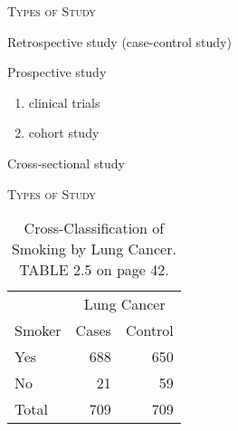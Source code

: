 \documentclass[dvipdfmx, serif,handout]{beamer}
\begin{document}
\begin{frame}{\textsc{Types of Study}}

	\bi
	\item Retrospective study (case-control study)
	\item Prospective study
	\begin{enumerate}
		\item clinical trials
		\item cohort study
	\end{enumerate}
	\item Cross-sectional study
	\ei

\end{frame}
\begin{frame}{\textsc{Types of Study}}

	{\footnotesize
		\begin{table}
			\begin{tabular}{lrr} \hline
				                    & \multicolumn{2}{c}{Lung Cancer}           \\ \cline{2-3}
				Smoker              & Cases                           & Control \\ \hline
				Yes                 & 688                             & 650     \\
				No                  & 21                              & 59      \\ \hline
				\hspace{.2cm} Total & 709                             & 709     \\ \hline
			\end{tabular}
			\caption{\footnotesize Cross-Classification of Smoking by Lung Cancer. TABLE 2.5 on page 42.}
		\end{table}
	}

\end{frame}
\end{document}
